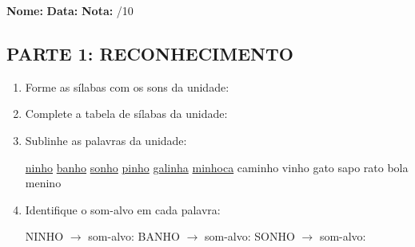 \begin{exercicio}

\noindent\textbf{Nome:} \underline{\hspace{3.2cm}} \quad \textbf{Data:} \underline{\hspace{1.6cm}} \quad \textbf{Nota:} \underline{\hspace{0.9cm}}/10


\subsection*{PARTE 1: RECONHECIMENTO}

\begin{enumerate}

  \item Forme as sílabas com os sons da unidade:

\begin{center}
\end{center}

  \item Complete a tabela de sílabas da unidade:

\begin{center}
\end{center}

  \item Sublinhe as palavras da unidade:

\begin{center}
  \uline{ninho} \quad \uline{banho} \quad \uline{sonho} \quad \uline{pinho} \quad \uline{galinha} \quad \uline{minhoca} \quad caminho \quad vinho \quad gato \quad sapo \quad rato \quad bola \quad menino
\end{center}

  \item Identifique o som-alvo em cada palavra:
  \begin{center}
  NINHO $\rightarrow$ som-alvo: \underline{\hspace{1cm}} \quad BANHO $\rightarrow$ som-alvo: \underline{\hspace{1cm}} \quad SONHO $\rightarrow$ som-alvo: \underline{\hspace{1cm}}
  \end{center}


\end{enumerate}
\end{exercicio}
